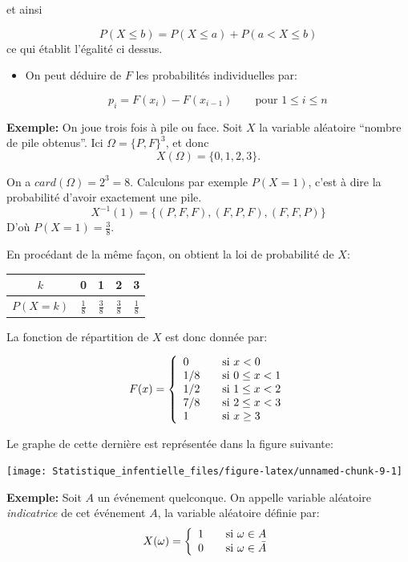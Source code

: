 \documentclass[]{book}
\newenvironment{rmdblock}[1]
  {\begin{shaded*}
  \begin{itemize}
  \renewcommand{\labelitemi}{
    \raisebox{-.7\height}[0pt][0pt]{
      {\setkeys{Gin}{width=2em,keepaspectratio}\texttt{[image: img/icons/\#1]}}
    }
  }
  \item
  }
  {
  \end{itemize}
  \end{shaded*}
  }
\newenvironment{rmdinsight}
  {\begin{rmdblock}{insight}}
  {\end{rmdblock}}
\theoremstyle{magentacolor}
\theoremstyle{proprie}
\theoremstyle{exstyle}
\theoremstyle{exostyle}
\theoremstyle{definition}
\theoremstyle{definition}
\theoremstyle{definition}
\theoremstyle{remark}
\begin{document}
et ainsi

\[P(X \leq b) = P(X \leq a) + P(a < X \leq b)\] ce qui établit l'égalité
ci dessus.

\begin{rmdinsight}
On peut déduire de \(F\) les probabilités individuelles par:

\[p_{i}=F(x_{i})-F(x_{i-1})\quad \quad \text{pour  } 1 \leq i \leq n\]
\end{rmdinsight}

\textbf{Exemple:} On joue trois fois à pile ou face. Soit \(X\) la variable aléatoire
``nombre de pile obtenus''. Ici \(\Omega=\{P, F\}^3\), et donc
\[X(\Omega)=\{0, 1, 2, 3\}.\]

On a \(card(\Omega)=2^3=8\). Calculons par exemple \(P(X=1)\), c'est à dire
la probabilité d'avoir exactement une pile.
\[X^{-1}(1)=\{(P, F, F), (F, P, F), (F, F, P) \}\] D'où
\(P(X=1)=\frac{3}{8}\).

En procédant de la même façon, on obtient la loi de probabilité de \(X\):

\begin{longtable}[]{@{}ccccc@{}}
\toprule
\(k\) & 0 & 1 & 2 & 3\tabularnewline
\midrule
\endhead
\(P(X = k)\) & \(\frac{1}{8}\) & \(\frac{3}{8}\) & \(\frac{3}{8}\) & \(\frac{1}{8}\)\tabularnewline
\bottomrule
\end{longtable}

La fonction de répartition de \(X\) est donc donnée par:

\[F(x) = \left\{ 
\begin{array}{l l}
 0 & \quad \text{si $x<0$}\\
  1/8 & \quad \text{si $0 \leq x < 1$}\\ 
   1/2 & \quad \text{si $1 \leq x < 2$}\\
    7/8 & \quad \text{si $2 \leq x < 3$}\\
     1 & \quad \text{si $x \geq 3$}\\
\end{array} \right.\]

Le graphe de cette dernière est représentée dans la figure suivante:

\begin{center}\texttt{[image: Statistique\_infentielle\_files/figure-latex/unnamed-chunk-9-1]} \end{center}

\textbf{Exemple:} Soit \(A\) un événement quelconque. On appelle variable aléatoire \emph{indicatrice} de cet événement \(A\), la variable aléatoire définie par: \[X(\omega) = \left\{ 
\begin{array}{l l}
 1 & \quad \text{si $\omega \in A$}\\
 0 & \quad \text{si $\omega \in \bar{A}$}\\   
  \end{array} \right.\]
\end{document}
